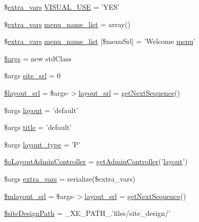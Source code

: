\begin{DoxyCompactItemize}
\$\hyperlink{ko_8install_8php_ae1dcb37fc34a8f312d2e6abd6f806743}{extra\+\_\+vars} \hyperlink{ko_8install_8php_a7d7de44c97265901bad00952f899d833}{V\+I\+S\+U\+A\+L\+\_\+\+U\+S\+E} = 'Y\+E\+S'
\item 
\$\hyperlink{ko_8install_8php_ae1dcb37fc34a8f312d2e6abd6f806743}{extra\+\_\+vars} \hyperlink{ko_8install_8php_a9223cf55eb6ff5239c0396968e619fbe}{menu\+\_\+name\+\_\+list} = array()
\item 
\$\hyperlink{ko_8install_8php_ae1dcb37fc34a8f312d2e6abd6f806743}{extra\+\_\+vars} \hyperlink{ko_8install_8php_aab93e295f18667faa1458cf574553e1f}{menu\+\_\+name\+\_\+list} \mbox{[}\$menu\+Srl\mbox{]} = 'Welcome \hyperlink{classmenu}{menu}'
\item 
\hyperlink{ko_8install_8php_a67e94494731d99ed23b123e95175bc10}{\$args} = new std\+Class
\item 
\$args \hyperlink{ko_8install_8php_a8b1406b4ad1048041558dce6bfe89004}{site\+\_\+srl} = 0
\item 
\hyperlink{ko_8install_8php_a77889723c4aa360089caae223118d413}{\$layout\+\_\+srl} = \$args-\/$>$\hyperlink{ko_8install_8php_a70054876db09b2519a1726663c8dd9e7}{layout\+\_\+srl} = \hyperlink{func_8inc_8php_a5a97b458f9c5b4fe3574671840aee27c}{get\+Next\+Sequence}()
\item 
\$args \hyperlink{ko_8install_8php_a0dc2cdff7167f362443808ff71ae5177}{layout} = 'default'
\item 
\$args \hyperlink{ko_8install_8php_a5b072c5fd1d2228c6ba5cee13cd142e3}{title} = 'default'
\item 
\$args \hyperlink{ko_8install_8php_a0532d89570cfdaebc628afac2ff5a81b}{layout\+\_\+type} = 'P'
\item 
\hyperlink{ko_8install_8php_a6a03496003da7df71cf94d9accb430be}{\$o\+Layout\+Admin\+Controller} = \hyperlink{func_8inc_8php_a2f7ca88a5226536aca3b2f5682bd7b2d}{get\+Admin\+Controller}('\hyperlink{classlayout}{layout}')
\item 
\$args \hyperlink{ko_8install_8php_ae1dcb37fc34a8f312d2e6abd6f806743}{extra\+\_\+vars} = serialize(\$extra\+\_\+vars)
\item 
\hyperlink{ko_8install_8php_a576210f0eec2e42df2c40e04a3972bb0}{\$mlayout\+\_\+srl} = \$args-\/$>$\hyperlink{ko_8install_8php_a70054876db09b2519a1726663c8dd9e7}{layout\+\_\+srl} = \hyperlink{func_8inc_8php_a5a97b458f9c5b4fe3574671840aee27c}{get\+Next\+Sequence}()
\item 
\hyperlink{ko_8install_8php_a0b79a974b91157b79d83cc0be7e3247c}{\$site\+Design\+Path} = \+\_\+\+X\+E\+\_\+\+P\+A\+T\+H\+\_\+.'files/site\+\_\+design/'

\end{DoxyCompactItemize}

